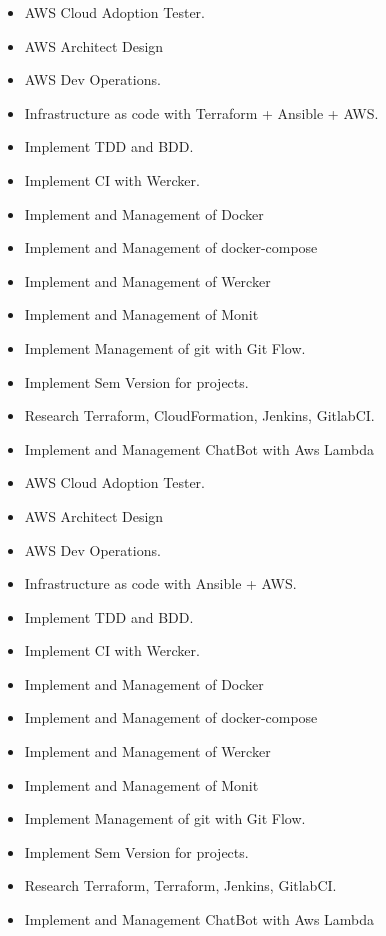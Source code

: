 \documentclass[10pt,a4paper]{altacv}
\begin{document}
\divider

\begin{itemize}
  \item AWS Cloud Adoption Tester.
  \item AWS Architect Design
  \item AWS Dev Operations.
  \item Infrastructure as code with Terraform + Ansible + AWS.
  \item Implement TDD and BDD.
  \item Implement CI with Wercker.
  \item Implement and Management of Docker
  \item Implement and Management of docker-compose
  \item Implement and Management of Wercker
  \item Implement and Management of Monit
  \item Implement Management of git with Git Flow.
  \item Implement Sem Version for projects.
  \item Research Terraform, CloudFormation, Jenkins, GitlabCI.
  \item Implement and Management ChatBot with Aws Lambda
\end{itemize}

\divider

\begin{itemize}
  \item AWS Cloud Adoption Tester.
  \item AWS Architect Design
  \item AWS Dev Operations.
  \item Infrastructure as code with Ansible + AWS.
  \item Implement TDD and BDD.
  \item Implement CI with Wercker.
  \item Implement and Management of Docker
  \item Implement and Management of docker-compose
  \item Implement and Management of Wercker
  \item Implement and Management of Monit
  \item Implement Management of git with Git Flow.
  \item Implement Sem Version for projects.
  \item Research Terraform, Terraform, Jenkins, GitlabCI.
  \item Implement and Management ChatBot with Aws Lambda
\end{itemize}
\end{document}
